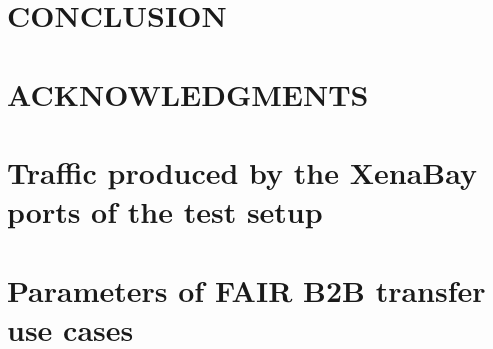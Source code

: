 \documentclass[%
 reprint,
 amsmath,amssymb,
 aps,
]{revtex4-1}
\begin{document}
\section{\label{conclusion}CONCLUSION}


\section{\label{acknowledgments}ACKNOWLEDGMENTS}





\onecolumngrid
\newpage
\appendix
\section{\label{appendixwr}Traffic produced by the XenaBay ports of the test setup}

\section{\label{appendix}Parameters of FAIR B2B transfer use cases}

\end{document}
